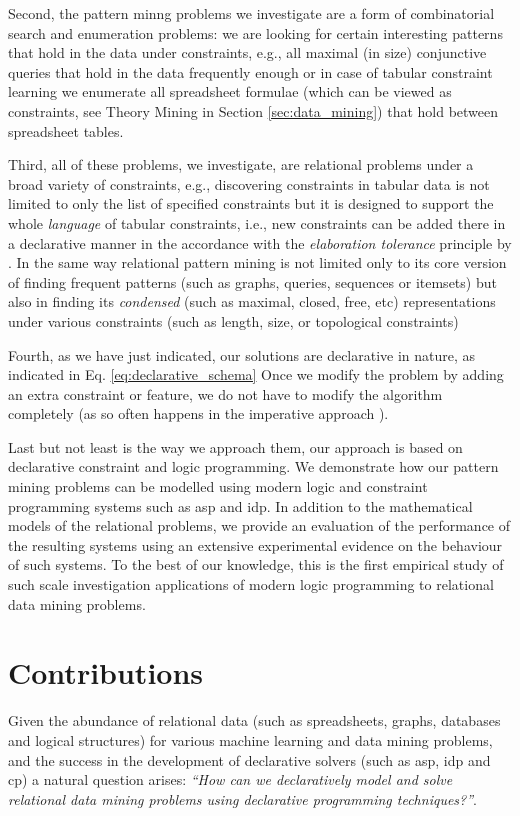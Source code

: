 Second, the pattern minng problems we investigate are a form of combinatorial search and
enumeration problems: we are looking for certain interesting patterns that hold in the data under constraints, e.g., all maximal
(in size) conjunctive queries that hold in the data frequently enough
or in case of tabular constraint learning we enumerate all spreadsheet
formulae (which can be viewed as constraints, see Theory Mining in
Section \ref{sec:data_mining}) that hold between
spreadsheet tables.


Third, all of these problems, we investigate, are relational problems under a
broad variety of constraints, e.g., discovering constraints in tabular
data is not limited to only the list of specified constraints but it
is designed to support the whole \textit{language} of tabular
constraints, i.e., new constraints can be added there in a declarative
manner in the accordance with the \textit{elaboration tolerance}
principle by \textcite{elaboration_tolerance}. In the same way
relational pattern mining is not limited only to its core version of
finding frequent patterns (such as graphs, queries, sequences or
itemsets) but also in finding its \textit{condensed} (such as maximal,
closed, free, etc) representations
under various constraints (such as length, size, or topological
constraints)

Fourth, as we have just indicated, our solutions are declarative in
nature, as indicated in Eq. \ref{eq:declarative_schema} Once we modify
the problem by adding an extra constraint or feature, we do not have
to modify the algorithm completely (as so often happens in the imperative approach \parencite{gspan,clospan}).

Last but not least is the way we approach them, our approach is based
on declarative constraint and logic programming. We demonstrate how
our pattern mining problems can be modelled using modern
logic and constraint programming systems such as \acrshort{asp} and \acrshort{idp}. In addition to the mathematical models
of the relational problems, we provide an evaluation of the
 performance of the resulting systems using an extensive experimental evidence on the behaviour of such systems. To the best of our knowledge, this is the first empirical study of such scale investigation applications of modern logic programming to relational data mining problems.
\pubrevend

\section{Contributions}\label{sec:contributions}
Given the abundance of relational data (such as spreadsheets, graphs,
databases and logical structures) for various machine learning and data
mining problems, and the success in the development of declarative solvers (such
as \acrshort{asp}, \acrshort{idp} and \acrshort{cp}) a
natural question arises: \textit{``How can we declaratively model and
solve relational data mining problems using declarative programming
techniques?''}. 

